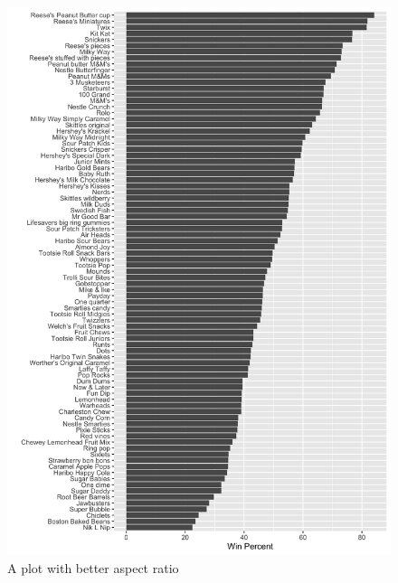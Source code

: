 \documentclass[
  letterpaper,
  DIV=11,
  numbers=noendperiod]{scrartcl}
\begin{document}
\begin{figure}

{\centering \includegraphics{barplot1.png}

}

\caption{A plot with better aspect ratio}

\end{figure}
\end{document}
